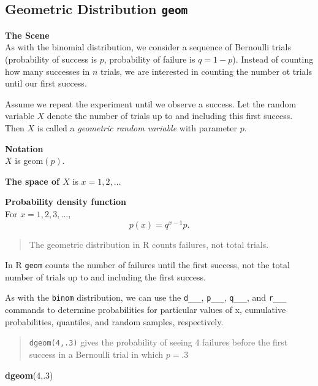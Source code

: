 \documentclass[
]{book}
\newenvironment{Shaded}{\begin{snugshade}}{\end{snugshade}}
\newcommand{\DecValTok}[1]{\textcolor[rgb]{0.00,0.00,0.81}{#1}}
\newcommand{\FunctionTok}[1]{\textcolor[rgb]{0.13,0.29,0.53}{\textbf{#1}}}
\newcommand{\NormalTok}[1]{#1}
\theoremstyle{definition}
\theoremstyle{definition}
\theoremstyle{definition}
\theoremstyle{definition}
\theoremstyle{remark}
\begin{document}
\subsection{\texorpdfstring{Geometric Distribution \texttt{geom}}{Geometric Distribution geom}}\label{geometric-distribution-geom}

\textbf{The Scene}\\
As with the binomial distribution, we consider a sequence of Bernoulli trials (probability of success is \(p\), probability of failure is \(q = 1-p\)). Instead of counting how many successes in \(n\) trials, we are interested in counting the number ot trials until our first success.

Assume we repeat the experiment until we observe a success. Let the random variable \(X\) denote the number of trials up to and including this first success. Then \(X\) is called a \emph{geometric random variable} with parameter \(p\).

\textbf{Notation}\\
\(X\) is geom\((p)\).

\textbf{The space of \(X\)} is \(x = 1, 2, \ldots\)

\textbf{Probability density function}\\
For \(x = 1, 2, 3, \ldots\), \[p(x)= q^{x-1}p.\]

\begin{quote}
The geometric distribution in R counts failures, not total trials.
\end{quote}

In R \texttt{geom} counts the number of failures until the first success, not the total number of trials up to and including the first success.

As with the \texttt{binom} distribution, we can use the \texttt{d\_\_\_}, \texttt{p\_\_\_}, \texttt{q\_\_\_}, and \texttt{r\_\_\_} commands to determine probabilities for particular values of x, cumulative probabilities, quantiles, and random samples, respectively.

\begin{quote}
\texttt{dgeom(4,.3)} gives the probability of seeing 4 failures before the first success in a Bernoulli trial in which \(p = .3\)
\end{quote}

\begin{Shaded}
\begin{Highlighting}[]
\FunctionTok{dgeom}\NormalTok{(}\DecValTok{4}\NormalTok{,.}\DecValTok{3}\NormalTok{)}
\end{Highlighting}
\end{Shaded}
\end{document}
